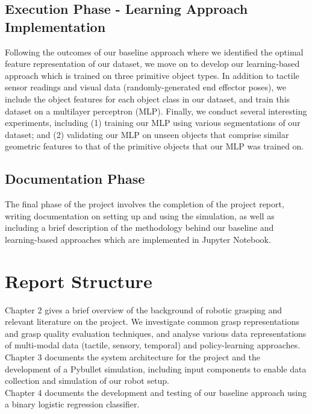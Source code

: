 \documentclass[11pt, a4paper]{report}
\begin{document}
\subsection{Execution Phase - Learning Approach Implementation}
\label{sec:1.4.4}
Following the outcomes of our baseline approach where we identified the optimal feature representation of our dataset, we move on to develop our learning-based approach which is trained on three primitive object types. In addition to tactile sensor readings and visual data (randomly-generated end effector poses), we include the object features for each object class in our dataset, and train this dataset on a multilayer perceptron (MLP). Finally, we conduct several interesting experiments, including (1) training our MLP using various segmentations of our dataset; and (2) validating our MLP on unseen objects that comprise similar geometric features to that of the primitive objects that our MLP was trained on.


\subsection{Documentation Phase}
\label{sec:1.4.5}
The final phase of the project involves the completion of the project report, writing documentation on setting up and using the simulation, as well as including a brief description of the methodology behind our baseline and learning-based approaches which are implemented in Jupyter Notebook.


\section{Report Structure}
\label{sec:1.5}
Chapter 2 gives a brief overview of the background of robotic grasping and relevant literature on the project. We investigate common grasp representations and grasp quality evaluation techniques, and analyse various data representations of multi-modal data (tactile, sensory, temporal) and policy-learning approaches.\\

Chapter 3 documents the system architecture for the project and the development of a Pybullet simulation, including input components to enable data collection and simulation of our robot setup.\\

Chapter 4 documents the development and testing of our baseline approach using a binary logistic regression classifier.\\
\end{document}
